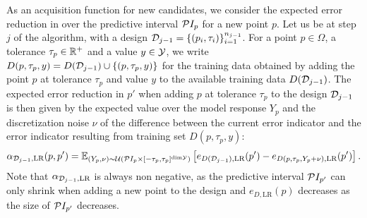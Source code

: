 As an acquisition function for new candidates, we consider the expected error reduction in over the predictive interval $\mathcal PI_{p}$ for a new point $p$. \newline
Let us be at step $j$ of the algorithm, with a design $\mathcal D_{j-1} = \{ (p_i, \tau_i) \}_{i=1}^{n_{j-1}}$.
For a point $p \in \Omega$, a tolerance $\tau_p\in \mathbb{R}^+$ and a value $y\in \mathcal Y$, we write $D(p,\tau_p, y) = D(\mathcal D_{j-1} ) \cup \{(p, \tau_p, y)\}$ for the training data obtained by adding the point $p$ at tolerance $\tau_p$ and value $y$ to the available training data $D(\mathcal D_{j-1})$. \newline
The expected error reduction in $p'$ when adding $p$ at tolerance $\tau_p$ to the design $\mathcal D_{j-1}$ is then given by the expected value over the model response $Y_p$ and the discretization noise $\nu$ of the difference between the current error indicator and the error indicator resulting from training set $D(p,\tau_p, y)$:
\begin{equation}\label{eq:alpha-LR-general}
    \alpha_{\mathcal D_{j-1}, \text{LR}}(p, p') = 
    \mathbb E _{ (Y_p, \nu) \sim \mathcal U( \mathcal PI_p \times  [-\tau_p, \tau_p] ^{ \text{dim} \mathcal Y } )} 
    \left[ 
        e_{D(\mathcal D_{j-1}), \text{LR}}(p')- e_{D(p,\tau_p, Y_p + \nu ), \text{LR}}(p')
    \right].
\end{equation}
Note that $\alpha_{\mathcal D_{j-1}, \text{LR}}$ is always non negative, as the predictive interval $\mathcal PI_{p'}$ can only shrink when adding a new point to the design and $e_{D, \text{LR}}(p)$ decreases as the size of $\mathcal PI_{p'}$ decreases. \medbreak

